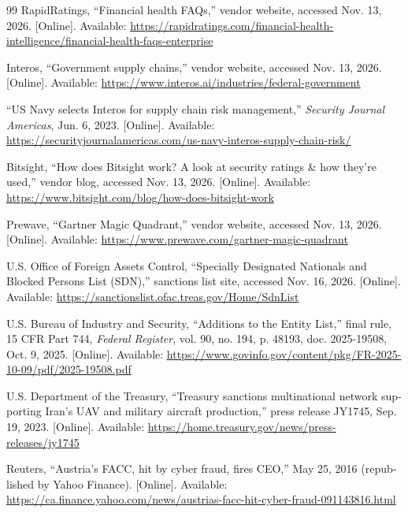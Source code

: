 \begin{otherlanguage}{english}
\begin{thebibliography}{99}
RapidRatings, ``Financial health FAQs,'' vendor website, accessed Nov. 13, 2026. [Online]. Available: \url{https://rapidratings.com/financial-health-intelligence/financial-health-faqs-enterprise}

Interos, ``Government supply chains,'' vendor website, accessed Nov. 13, 2026. [Online]. Available: \url{https://www.interos.ai/industries/federal-government}

``US Navy selects Interos for supply chain risk management,'' \emph{Security Journal Americas}, Jun. 6, 2023. [Online]. Available: \url{https://securityjournalamericas.com/us-navy-interos-supply-chain-risk/}

Bitsight, ``How does Bitsight work? A look at security ratings \& how they're used,'' vendor blog, accessed Nov. 13, 2026. [Online]. Available: \url{https://www.bitsight.com/blog/how-does-bitsight-work}

Prewave, ``Gartner Magic Quadrant,'' vendor website, accessed Nov. 13, 2026. [Online]. Available: \url{https://www.prewave.com/gartner-magic-quadrant}

U.S. Office of Foreign Assets Control, ``Specially Designated Nationals and Blocked Persons List (SDN),'' sanctions list site, accessed Nov. 16, 2026. [Online]. Available: \url{https://sanctionslist.ofac.treas.gov/Home/SdnList}

U.S. Bureau of Industry and Security, ``Additions to the Entity List,'' final rule, 15 CFR Part 744, \emph{Federal Register}, vol. 90, no. 194, p. 48193, doc. 2025-19508, Oct. 9, 2025. [Online]. Available: \url{https://www.govinfo.gov/content/pkg/FR-2025-10-09/pdf/2025-19508.pdf}

U.S. Department of the Treasury, ``Treasury sanctions multinational network supporting Iran's UAV and military aircraft production,'' press release JY1745, Sep. 19, 2023. [Online]. Available: \url{https://home.treasury.gov/news/press-releases/jy1745}

Reuters, ``Austria's FACC, hit by cyber fraud, fires CEO,'' May 25, 2016 (republished by Yahoo Finance). [Online]. Available: \url{https://ca.finance.yahoo.com/news/austrias-facc-hit-cyber-fraud-091143816.html}


\end{thebibliography}
\end{otherlanguage}
